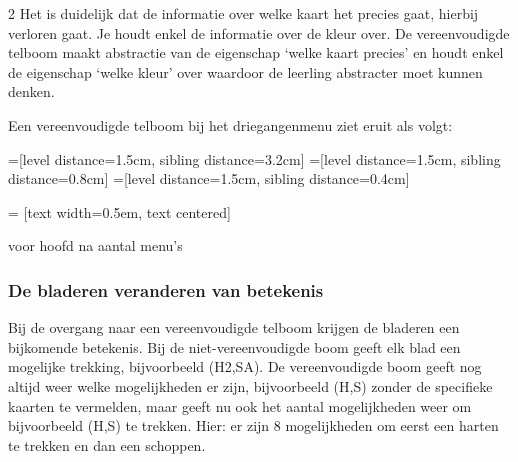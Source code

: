 \begin{multicols}{2}
Het is duidelijk dat de informatie over welke kaart het precies gaat, hierbij verloren gaat. Je houdt enkel de informatie over de kleur over. De vereenvoudigde telboom maakt abstractie van de eigenschap ‘welke kaart precies’ en houdt enkel de eigenschap ‘welke kleur’ over waardoor de leerling abstracter moet kunnen denken.

Een vereenvoudigde telboom bij het driegangenmenu ziet eruit als volgt:
 
\begin{afbeeldingenv}
=[level distance=1.5cm, sibling distance=3.2cm]
=[level distance=1.5cm, sibling distance=0.8cm]
=[level distance=1.5cm, sibling distance=0.4cm]

 = [text width=0.5em, text centered]

\hspace{0.5cm}voor \hspace{0.6cm}hoofd \hspace{0.8cm}na  \hspace{0.5cm}aantal menu's
\\
\caption{Vereenvoudigde telboom Driegangenmenu}
\label{fig:menu_vereenvoudigd}
\end{afbeeldingenv}
    
\subsubsection{De bladeren veranderen van betekenis}
Bij de overgang naar een vereenvoudigde telboom krijgen de bladeren een bijkomende betekenis. Bij de niet-vereenvoudigde boom geeft elk blad een mogelijke trekking, bijvoorbeeld (H2,SA). De vereenvoudigde boom geeft nog altijd weer welke mogelijkheden er zijn, bijvoorbeeld (H,S) zonder de specifieke kaarten te vermelden, maar geeft nu ook het aantal mogelijkheden weer om bijvoorbeeld (H,S) te trekken. Hier: er zijn 8 mogelijkheden om eerst een harten te trekken en dan een schoppen. 


\end{multicols}
